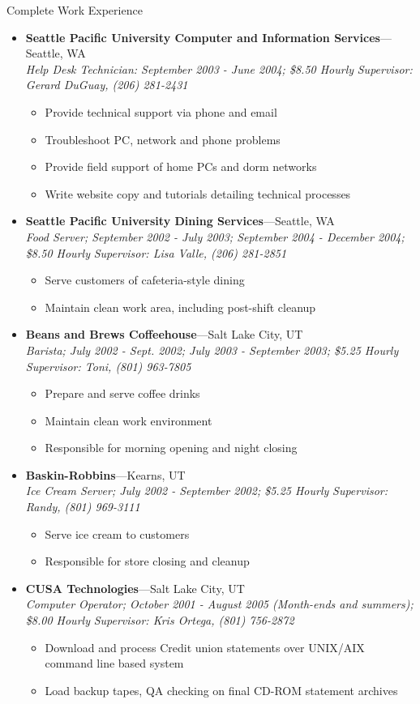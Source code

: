 \documentclass[11pt,oneside]{article}
\newenvironment{ressection}[1]{
	\vspace{4pt}
	{\fontfamily{phv}\selectfont\Large#1}
	\begin{itemize}
	\vspace{3pt}
}{
	\end{itemize}
}
\newcommand{\ressubitem}[1]{
	\vspace{-1pt}
	\item \begin{flushleft} #1 \end{flushleft}
}
\newenvironment{ressubsec}[4]{
	\item
	\textbf{#1}---#2 \\
	\textit{#3}
	\newline
	\textit{#4}
	\vspace{-2pt}
	\begin{itemize}
}{
	\end{itemize}
}
\begin{document}
\begin{ressection}{Complete Work Experience}
	\begin{ressubsec}{Seattle Pacific University Computer and Information Services}{Seattle, WA}{Help Desk Technician: September 2003 - June 2004; \$8.50 Hourly}{Supervisor: Gerard DuGuay, (206) 281-2431}
		\ressubitem{Provide technical support via phone and email}
		\ressubitem{Troubleshoot PC, network and phone problems}
		\ressubitem{Provide field support of home PCs and dorm networks}
		\ressubitem{Write website copy and tutorials detailing technical processes}
	\end{ressubsec}

	\begin{ressubsec}{Seattle Pacific University Dining Services}{Seattle, WA}{Food Server; September 2002 - July 2003; September 2004 - December 2004; \$8.50 Hourly}{Supervisor: Lisa Valle, (206) 281-2851}
		\ressubitem{Serve customers of cafeteria-style dining}
		\ressubitem{Maintain clean work area, including post-shift cleanup}
	\end{ressubsec}

	\begin{ressubsec}{Beans and Brews Coffeehouse}{Salt Lake City, UT}{Barista; July 2002 - Sept. 2002; July 2003 - September 2003; \$5.25 Hourly}{Supervisor: Toni, (801) 963-7805}
		\ressubitem{Prepare and serve coffee drinks}
		\ressubitem{Maintain clean work environment}
		\ressubitem{Responsible for morning opening and night closing}
	\end{ressubsec}

	\begin{ressubsec}{Baskin-Robbins}{Kearns, UT}{Ice Cream Server; July 2002 - September 2002; \$5.25 Hourly}{Supervisor: Randy, (801) 969-3111}
		\ressubitem{Serve ice cream to customers}
		\ressubitem{Responsible for store closing and cleanup}
	\end{ressubsec}

	\begin{ressubsec}{CUSA Technologies}{Salt Lake City, UT}{Computer Operator; October 2001 - August 2005 (Month-ends and summers); \$8.00 Hourly}{Supervisor: Kris Ortega, (801) 756-2872}
		\ressubitem{Download and process Credit union statements over UNIX/AIX command line based system}
		\ressubitem{Load backup tapes, QA checking on final CD-ROM statement archives}
	\end{ressubsec}

\end{ressection}
\end{document}
